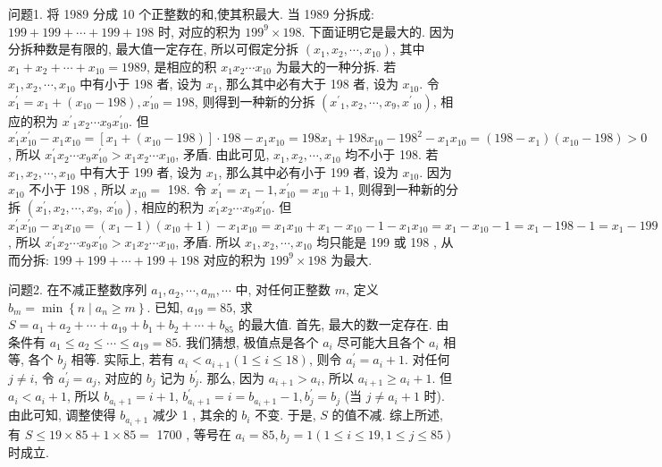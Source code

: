 
问题1. 将 1989 分成 10 个正整数的和,使其积最大.
当 1989 分拆成: $199+199+\cdots+199+198$ 时, 对应的积为 $199^9 \times 198$.
下面证明它是最大的.
因为分拆种数是有限的, 最大值一定存在, 所以可假定分拆 $\left(x_1, x_2, \cdots, x_{10}\right)$, 其中 $x_1+x_2+\cdots+x_{10}=1989$, 是相应的积 $x_1 x_2 \cdots x_{10}$ 为最大的一种分拆.
若 $x_1, x_2, \cdots, x_{10}$ 中有小于 198 者, 设为 $x_1$, 那么其中必有大于 198 者, 设为 $x_{10}$. 令 $x_1^{\prime}=x_1+\left(x_{10}-198\right), x_{10}^{\prime}=198$, 则得到一种新的分拆 $\left(x^{\prime}{ }_1, x_2, \cdots, x_9, x^{\prime}{ }_{10}\right)$, 相应的积为 $x^{\prime}{ }_1 x_2 \cdots x_9 x_{10}^{\prime}$. 但 $x_1^{\prime} x_{10}^{\prime}-x_1 x_{10}=\left[x_1+\left(x_{10}-198\right)\right] \cdot 198-x_1 x_{10}=198 x_1+198 x_{10}-198^2- x_1 x_{10}=\left(198-x_1\right)\left(x_{10}-198\right)>0$, 所以 $x_1^{\prime} x_2 \cdots x_9 x_{10}^{\prime}>x_1 x_2 \cdots x_{10}$, 矛盾.
由此可见, $x_1, x_2, \cdots, x_{10}$ 均不小于 198. 若 $x_1, x_2, \cdots, x_{10}$ 中有大于 199 者, 设为 $x_1$, 那么其中必有小于 199 者, 设为 $x_{10}$. 因为 $x_{10}$ 不小于 198 , 所以 $x_{10}=$ 198. 令 $x_1^{\prime}=x_1-1, x_{10}^{\prime}=x_{10}+1$, 则得到一种新的分拆 $\left(x_1^{\prime}, x_2, \cdots, x_9\right.$, $\left.x_{10}^{\prime}\right)$, 相应的积为 $x_1^{\prime} x_2 \cdots x_9 x_{10}^{\prime}$. 但 $x_1^{\prime} x_{10}^{\prime}-x_1 x_{10}=\left(x_1-1\right)\left(x_{10}+1\right)- x_1 x_{10}=x_1 x_{10}+x_1-x_{10}-1-x_1 x_{10}=x_1-x_{10}-1=x_1-198-1=x_1- 199>0$, 所以 $x_1^{\prime} x_2 \cdots x_9 x_{10}^{\prime}>x_1 x_2 \cdots x_{10}$, 矛盾.
所以 $x_1, x_2, \cdots, x_{10}$ 均只能是 199 或 198 , 从而分拆: $199+199+\cdots+199+198$ 对应的积为 $199^9 \times 198$ 为最大.



问题2. 在不减正整数序列 $a_1, a_2, \cdots, a_m, \cdots$ 中, 对任何正整数 $m$, 定义 $b_m= \min \left\{n \mid a_n \geqslant m\right\}$. 已知, $a_{19}=85$, 求 $S=a_1+a_2+\cdots+a_{19}+b_1+b_2+\cdots+ b_{85}$ 的最大值.
首先, 最大的数一定存在.
由条件有 $a_1 \leqslant a_2 \leqslant \cdots \leqslant a_{19}=85$. 我们猜想, 极值点是各个 $a_i$ 尽可能大且各个 $a_i$ 相等, 各个 $b_j$ 相等.
实际上, 若有 $a_i<a_{i+1}(1 \leqslant i \leqslant 18)$, 则令 $a_i^{\prime}=a_i+1$. 对任何 $j \neq i$, 令 $a_j^{\prime}=a_j$, 对应的 $b_j$ 记为 $b_j^{\prime}$. 那么, 因为 $a_{i+1}>a_i$, 所以 $a_{i+1} \geqslant a_i+1$. 但 $a_i<a_i+1$, 所以 $b_{a_i+1}=i+1$, $b_{a_i+1}^{\prime}=i=b_{a_i+1}-1, b_j^{\prime}=b_j$ (当 $j \neq a_i+1$ 时). 由此可知, 调整使得 $b_{a_i+1}$ 减少 1 , 其余的 $b_i$ 不变.
于是, $S$ 的值不减.
综上所述, 有 $S \leqslant 19 \times 85+1 \times 85=$ 1700 , 等号在 $a_i=85, b_j=1(1 \leqslant i \leqslant 19,1 \leqslant j \leqslant 85)$ 时成立.



